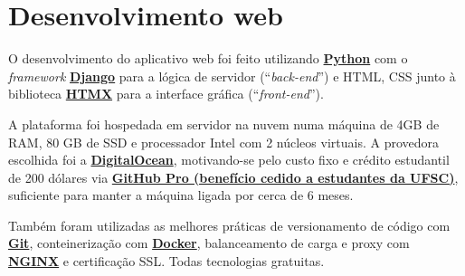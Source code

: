\section{Desenvolvimento web}

O desenvolvimento do aplicativo web foi feito utilizando \href{https://www.python.org/}{\textbf{Python}} com o \textit{framework} \href{https://www.djangoproject.com/}{\textbf{Django}} para a lógica de servidor (“\textit{back-end}”) e \gls{HTML}, \gls{CSS} junto à biblioteca \href{https://htmx.org/}{\textbf{HTMX}} para a interface gráfica (“\textit{front-end}”).

A plataforma foi hospedada em servidor na nuvem numa máquina de 4GB de \gls{RAM}, 80 GB de \gls{SSD} e processador Intel com 2 núcleos virtuais. A provedora escolhida foi a \href{https://www.digitalocean.com/}{\textbf{DigitalOcean}}, motivando-se pelo custo fixo e crédito estudantil de 200 dólares via \href{https://education.github.com/pack}{\textbf{GitHub Pro (benefício cedido a estudantes da UFSC)}}, suficiente para manter a máquina ligada por cerca de 6 meses.

Também foram utilizadas as melhores práticas de versionamento de código com \href{https://git-scm.com/}{\textbf{Git}}, conteinerização com \href{https://www.docker.com/}{\textbf{Docker}}, balanceamento de carga e proxy com \href{https://www.nginx.com/}{\textbf{NGINX}} e certificação \gls{SSL}. Todas tecnologias gratuitas.